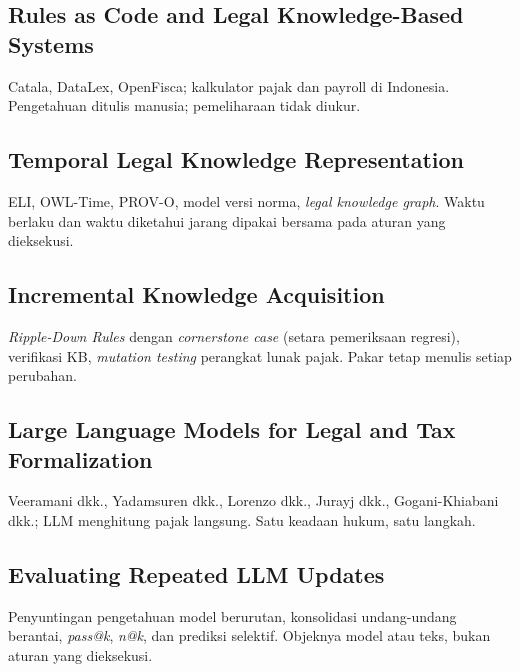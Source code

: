 \documentclass{ieeeaccess}
\newenvironment{isi}{\par\smallskip\footnotesize\color{draftblue}\noindent}{\par\smallskip\normalsize\color{black}}
\begin{document}
\subsection{Rules as Code and Legal Knowledge-Based Systems}
\begin{isi}Catala, DataLex, OpenFisca; kalkulator pajak dan payroll di Indonesia. Pengetahuan ditulis manusia; pemeliharaan tidak diukur.\end{isi}

\subsection{Temporal Legal Knowledge Representation}
\begin{isi}ELI, OWL-Time, PROV-O, model versi norma, \textit{legal knowledge graph}. Waktu berlaku dan waktu diketahui jarang dipakai bersama pada aturan yang dieksekusi.\end{isi}

\subsection{Incremental Knowledge Acquisition}
\begin{isi}\textit{Ripple-Down Rules} dengan \textit{cornerstone case} (setara pemeriksaan regresi), verifikasi KB, \textit{mutation testing} perangkat lunak pajak. Pakar tetap menulis setiap perubahan.\end{isi}

\subsection{Large Language Models for Legal and Tax Formalization}
\begin{isi}Veeramani dkk., Yadamsuren dkk., Lorenzo dkk., Jurayj dkk., Gogani-Khiabani dkk.; LLM menghitung pajak langsung. Satu keadaan hukum, satu langkah.\end{isi}

\subsection{Evaluating Repeated LLM Updates}
\begin{isi}Penyuntingan pengetahuan model berurutan, konsolidasi undang-undang berantai, \textit{pass@k}, \textit{n@k}, dan prediksi selektif. Objeknya model atau teks, bukan aturan yang dieksekusi.\end{isi}
\end{document}
